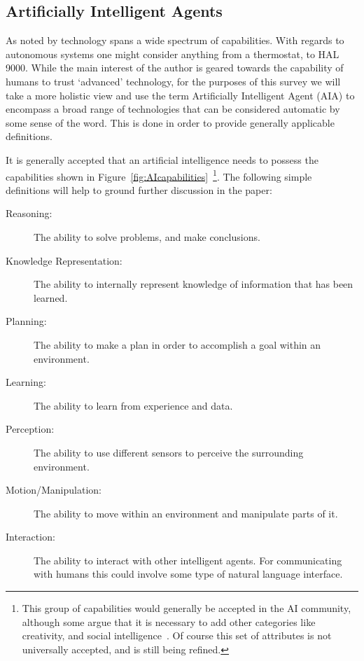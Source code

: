 \subsection{Artificially Intelligent Agents} \label{sec:aias}
    As noted by \citet{Tripp2011-rx} technology spans a wide spectrum of capabilities. With regards to autonomous systems one might consider anything from a thermostat, to HAL 9000. While the main interest of the author is geared towards the capability of humans to trust `advanced' technology, for the purposes of this survey we will take a more holistic view and use the term Artificially Intelligent Agent (AIA) to encompass a broad range of technologies that can be considered automatic by some sense of the word. This is done in order to provide generally applicable definitions.

    It is generally accepted that an artificial intelligence needs to possess the capabilities shown in Figure~\ref{fig:AIcapabilities}~\cite{Russell2010-wv,Nilsson2009-rp,Luger2008-vf}\footnote{This group of capabilities would generally be accepted in the AI community, although some argue that it is  necessary to add other categories like creativity, and social intelligence~\cite{Duch2007-oi,Tao2005-kh}. Of course this set of attributes is not universally accepted, and is still being refined.}. The following simple definitions will help to ground further discussion in the paper:

    \begin{description}
        \item [Reasoning:] The ability to solve problems, and make conclusions.
        \item [Knowledge Representation:] The ability to internally represent knowledge of information that has been learned.
        \item [Planning:] The ability to make a plan in order to accomplish a goal within an environment.
        \item [Learning:] The ability to learn from experience and data.
        \item [Perception:] The ability to use different sensors to perceive the surrounding environment.
        \item [Motion/Manipulation:] The ability to move within an environment and manipulate parts of it.
        \item [Interaction:] The ability to interact with other intelligent agents. For communicating with humans this could involve some type of natural language interface.
    \end{description}

